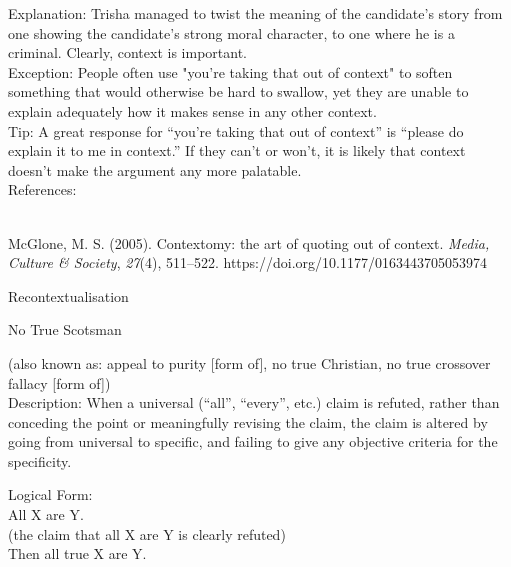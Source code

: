 \documentclass[a4paper,12pt,single,pdftex]{scrbook}
\begin{document}
    
      Explanation: Trisha managed to twist the meaning of the candidate's story from one showing the candidate's strong moral character, to one where he is a criminal. Clearly, context is important.
    \\

    
      Exception: People often use "you're taking that out of context" to soften something that would otherwise be hard to swallow, yet they are unable to explain adequately how it makes sense in any other context.
    \\

    
      Tip: A great response for “you’re taking that out of context” is “please do explain it to me in context.” If they can’t or won’t, it is likely that context doesn’t make the argument any more palatable.
    \\

    References:

    
      
        
      \\

      
        
          McGlone, M. S. (2005). Contextomy: the art of quoting out of context. {\it Media, Culture \& Society}, {\it 27}(4), 511–522. https://doi.org/10.1177/0163443705053974
        
      
    
  

Recontextualisation

No True Scotsman
    
      (also known as: appeal to purity [form of], no true Christian, no true crossover fallacy [form of])
    \\

  
    Description: When a universal (“all”, “every”, etc.) claim is refuted, rather than conceding the point or meaningfully revising the claim, the claim is altered by going from universal to specific, and failing to give any objective criteria for the specificity.

    
      Logical Form:
    \\

    
      All X are Y.
    \\

    
      (the claim that all X are Y is clearly refuted)
    \\

    
      Then all true X are Y.
    \\
\end{document}
